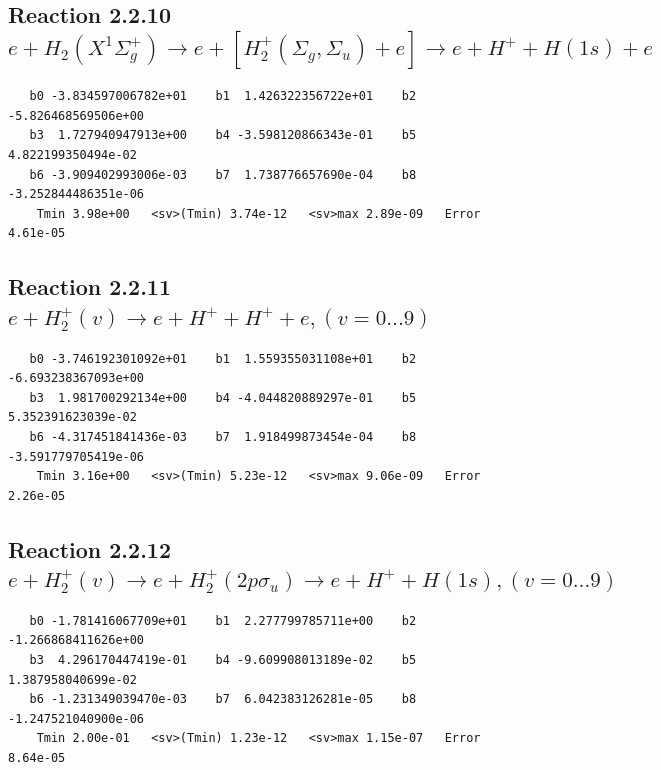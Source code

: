 \documentclass[12pt,dvipdfmx]{article}
\begin{document}
\subsection{
Reaction 2.2.10 $e + H_2(X^1\Sigma_g^+) \rightarrow
e + [H_2^+(\Sigma_g, \Sigma_u) + e] \rightarrow e + H^+ + H(1s) + e$}














\begin{small}\begin{verbatim}
   b0 -3.834597006782e+01    b1  1.426322356722e+01    b2 -5.826468569506e+00
   b3  1.727940947913e+00    b4 -3.598120866343e-01    b5  4.822199350494e-02
   b6 -3.909402993006e-03    b7  1.738776657690e-04    b8 -3.252844486351e-06
    Tmin 3.98e+00   <sv>(Tmin) 3.74e-12   <sv>max 2.89e-09   Error 4.61e-05
\end{verbatim}\end{small}

\newpage
\subsection{
Reaction 2.2.11 $  e + H_2^+(v) \rightarrow e + H^+ + H^+ + e, (v=0\ldots 9)$}


\begin{small}\begin{verbatim}
   b0 -3.746192301092e+01    b1  1.559355031108e+01    b2 -6.693238367093e+00
   b3  1.981700292134e+00    b4 -4.044820889297e-01    b5  5.352391623039e-02
   b6 -4.317451841436e-03    b7  1.918499873454e-04    b8 -3.591779705419e-06
    Tmin 3.16e+00   <sv>(Tmin) 5.23e-12   <sv>max 9.06e-09   Error 2.26e-05
\end{verbatim}\end{small}

\newpage
\subsection{
Reaction 2.2.12 $  e + H_2^+(v) \rightarrow e + H_2^+(2p\sigma_u) \rightarrow e + H^+ + H(1s), (v=0\ldots 9)$}


\begin{small}\begin{verbatim}
   b0 -1.781416067709e+01    b1  2.277799785711e+00    b2 -1.266868411626e+00
   b3  4.296170447419e-01    b4 -9.609908013189e-02    b5  1.387958040699e-02
   b6 -1.231349039470e-03    b7  6.042383126281e-05    b8 -1.247521040900e-06
    Tmin 2.00e-01   <sv>(Tmin) 1.23e-12   <sv>max 1.15e-07   Error 8.64e-05
\end{verbatim}\end{small}
\end{document}
